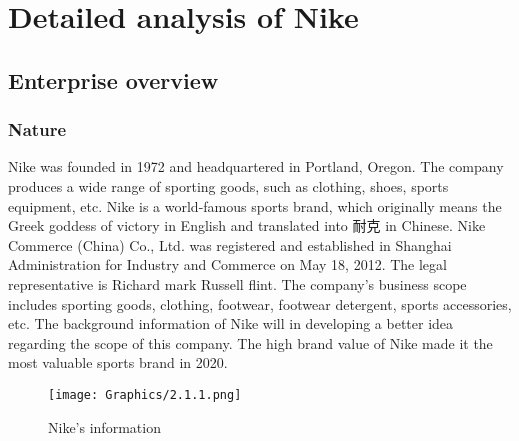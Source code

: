 \documentclass[a4paper, 12pt]{report}
\begin{document}
\chapter{Detailed analysis of Nike}
\section{Enterprise overview}
\subsection{Nature}
Nike was founded in 1972 and headquartered in Portland, Oregon. The company produces a wide range of sporting goods, such as clothing, shoes, sports equipment, etc. Nike is a world-famous sports brand, which originally means the Greek goddess of victory in English and translated into 耐克 in Chinese. Nike Commerce (China) Co., Ltd. was registered and established in Shanghai Administration for Industry and Commerce on May 18, 2012. The legal representative is Richard mark Russell flint. The company's business scope includes sporting goods, clothing, footwear, footwear detergent, sports accessories, etc. The background information of Nike will in developing a better idea regarding the scope of this company. The high brand value of Nike made it the most valuable sports brand in 2020.
 \begin{figure}[p]
 			\begin{center}
				\texttt{[image: Graphics/2.1.1.png]}
			\end{center}
       		\caption{\label{2.1.1}Nike's information}
\end{figure}
\newpage
\end{document}
